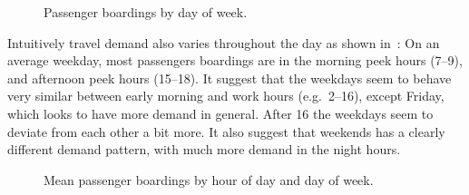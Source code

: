 \begin{figure}[!ht]
    \center
    
    \vspace{-2em}
    \caption{Passenger boardings by day of week.}
    \label{fig:travelcard_boxplot}
\end{figure}

Intuitively travel demand also varies throughout the day as shown in~: On an average weekday, most passengers boardings are in the morning peek hours (7--9), and afternoon peek hours (15--18). It suggest that the weekdays seem to behave very similar between early morning and work hours (e.g.\ 2--16), except Friday, which looks to have more demand in general. After 16 the weekdays seem to deviate from each other a bit more. It also suggest that weekends has a clearly different demand pattern, with much more demand in the night hours.
\begin{figure}[!ht]
    \center
    
    \vspace{-2em}
    \caption{Mean passenger boardings by hour of day and day of week.}
    \label{fig:travelcard_hist}
\end{figure}
